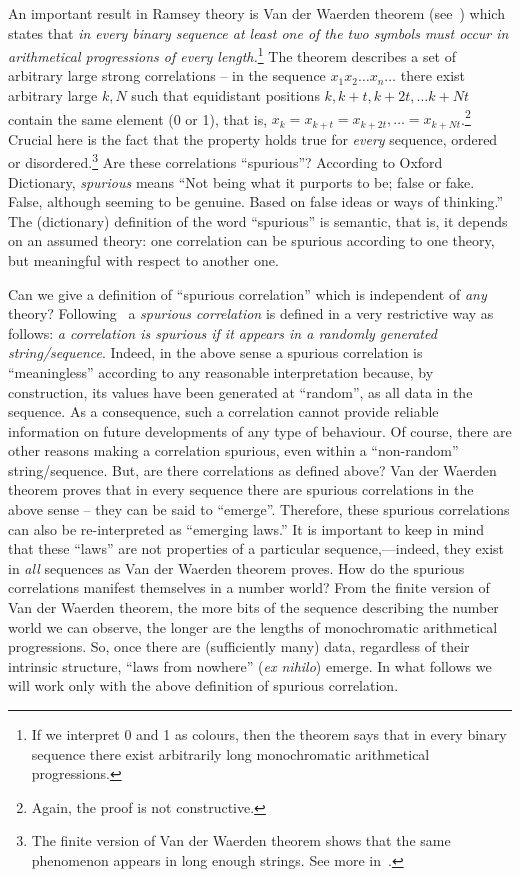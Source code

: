\documentclass[12pt]{article}
\begin{document}
An important result in Ramsey theory is Van der Waerden theorem (see~\cite{graham}) which states that {\em in every
binary sequence at least one of
the two symbols must occur in arithmetical progressions of every
length.}\footnote{If we interpret 0 and 1 as colours,
then the theorem says that in every binary sequence there exist arbitrarily long monochromatic arithmetical
progressions.} The theorem describes a set of arbitrary large strong correlations -- in the sequence $x_1x_2\dots
x_n\dots$ there exist arbitrary large $k, N$ such that equidistant positions $k, k+t, k+2t, \dots k+Nt$ contain the same
element (0 or 1), that is, $x_k = x_{k+t}= x_{k+2t}, \dots =x_{k+Nt}$.\footnote{Again,
the proof is not constructive.} Crucial here is the fact that the property holds true for {\em every} sequence, ordered or
disordered.\footnote{The finite version of  Van der Waerden theorem shows  that the same phenomenon appears in long enough strings. See more
in~\cite{suprious2016}.}
Are these correlations ``spurious''?
According to Oxford Dictionary, {\it spurious} means ``Not being what it purports to be; false or fake. False, although
seeming to be genuine. Based on false ideas or ways of thinking.'' The (dictionary) definition of the word ``spurious'' is
semantic, that is, it depends on an assumed theory: one correlation can be spurious according to one theory, but
meaningful with respect to another one.

Can we give a definition of ``spurious correlation'' which is independent of {\it any} theory? Following~\cite{suprious2016} a
{\it spurious correlation} is defined in a very restrictive way as follows:
{\it a correlation is {\it spurious} if it appears in a randomly generated string/sequence}.
Indeed, in the above sense a spurious correlation
is ``meaningless'' according to any reasonable interpretation  because, by construction, its values have been generated at ``random'', as
all data in the sequence.  As a consequence, such a correlation cannot provide reliable information on future developments of any type of behaviour.
Of course, there are other reasons making a correlation spurious, even within a ``non-random'' string/sequence.  But, are there  correlations as defined above?
Van der Waerden theorem proves that in every sequence there are spurious correlations in the above sense --
they
can be said to ``emerge''.
Therefore, these spurious correlations can also be re-interpreted as ``emerging laws.''
It is important to keep in mind that these ``laws'' are not properties of a particular sequence,---indeed, they exist in  {\em all} sequences as Van der Waerden theorem proves.
How do the spurious correlations manifest themselves in a number world? From the finite version of   Van der Waerden theorem, the more bits of the sequence describing the
number world we can observe, the longer are the lengths of monochromatic arithmetical progressions.
So, once there are (sufficiently many) data, regardless of their intrinsic structure, ``laws from nowhere''
({\it ex nihilo}) emerge.  In what follows we will work only with the above definition of
spurious correlation.
\end{document}
